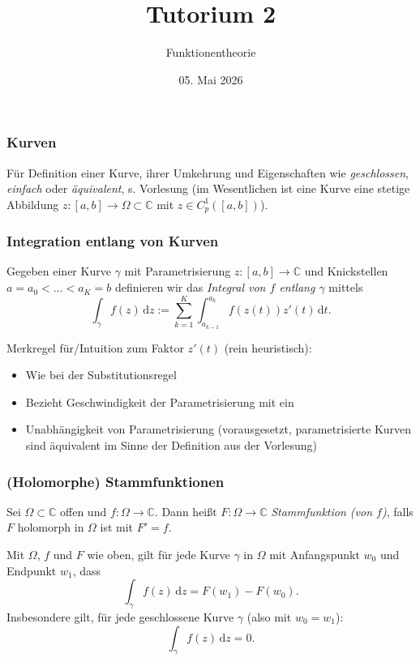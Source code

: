 \documentclass[10pt]{beamer}
\author[\url{https://fdf-uni.github.io/ft}]{}
\title{Tutorium 2}
\subtitle{\texorpdfstring{Funktionentheorie\vspace*{-1.5cm}}{Funktionentheorie}}
\date{05. Mai 2026}
\begin{document}
\begin{frame}
	\titlepage
\end{frame}
\begin{frame}
	\frametitle{Kurven}
	\pause
	Für Definition einer Kurve, ihrer Umkehrung und Eigenschaften wie \emph{geschlossen}, \emph{einfach} oder \emph{äquivalent}, s. Vorlesung (im Wesentlichen ist eine Kurve eine stetige Abbildung $z \colon [a, b] \to \Omega \subset \mathbb{C}$ mit $z \in C_p^1([a, b])$).
\end{frame}
\begin{frame}
	\frametitle{Integration entlang von Kurven}
	\begin{definition}[Kurvenintegral]
		Gegeben einer Kurve $\gamma$ mit Parametrisierung $z \colon [a, b] \to \mathbb{C}$ und \glqq{}Knickstellen\grqq{} $a = a_0 < \ldots < a_K = b$ definieren wir das \emph{Integral von $f$ entlang $\gamma$} mittels
		\[
			\int_{\gamma} f(z) \,\mathrm{d}z := \sum_{k=1}^{K} \int_{a_{k-1}}^{a_k} f(z(t)) z'(t) \,\mathrm{d}t.
		\]
	\end{definition}
	\pause
	Merkregel für/Intuition zum Faktor $z'(t)$ (rein heuristisch):
	\pause
	\begin{itemize}
		\item \glqq{}Wie bei der Substitutionsregel\grqq{}
		      \pause
		\item Bezieht \glqq{}Geschwindigkeit\grqq{} der Parametrisierung mit ein
		      \pause
		\item Unabhängigkeit von Parametrisierung (vorausgesetzt, parametrisierte Kurven sind äquivalent im Sinne der Definition aus der Vorlesung)
	\end{itemize}
\end{frame}
\begin{frame}
	\frametitle{(Holomorphe) Stammfunktionen}
	\begin{definition}
		Sei $\Omega \subset \mathbb{C}$ offen und $f \colon \Omega \to \mathbb{C}$.
		Dann heißt $F \colon \Omega \to \mathbb{C}$ \emph{Stammfunktion (von $f$)}, falls $F$ holomorph in $\Omega$ ist mit $F' = f$.
	\end{definition}
	\pause
	\begin{theorem}
		Mit $\Omega$, $f$ und $F$ wie oben, gilt für jede Kurve $\gamma$ in $\Omega$ mit Anfangspunkt $w_0$ und Endpunkt $w_1$, dass
		\[
			\int_{\gamma} f(z) \,\mathrm{d}z = F(w_1) - F(w_0).
		\]
		Insbesondere gilt, für jede geschlossene Kurve $\gamma$ (also mit $w_0 = w_1$):
		\[
			\int_{\gamma} f(z) \,\mathrm{d}z = 0.
		\]
	\end{theorem}
\end{frame}
\end{document}

